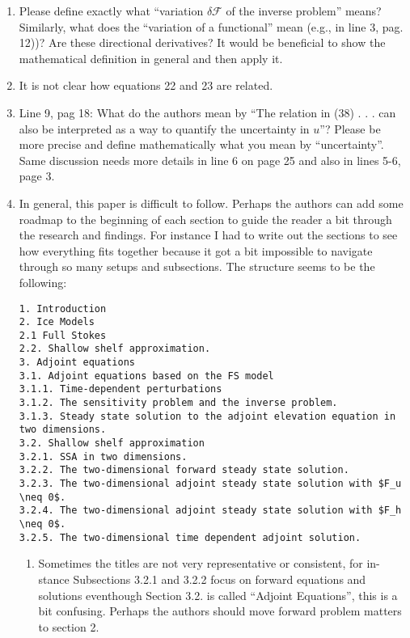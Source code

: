 \documentclass{article}
\begin{document}
\begin{enumerate}
    \item  Please define exactly what “variation $\delta\mathcal{F}$ of the inverse problem” means? Similarly, what does the “variation of a functional” mean (e.g., in line 3, pag. 12))? Are these directional derivatives? It would be beneficial to show the mathematical definition in general and then apply it.
    
    \item It is not clear how equations 22 and 23 are related.
    
    \item Line 9, pag 18: What do the authors mean by “The relation in (38) . . . can also be interpreted as a way to quantify the uncertainty in $u$”? Please be more precise and define mathematically what you mean by “uncertainty”. Same discussion needs more details in line 6 on page 25 and also in lines 5-6, page 3.
    
    \item In general, this paper is difficult to follow. Perhaps the authors can add some roadmap to the beginning of each section to guide the reader a bit through the research and findings. For instance I had to write out the sections to see how everything fits together because it got a bit impossible to navigate through so many setups and subsections. The structure seems to be the following:
    \begin{verbatim}
1. Introduction
2. Ice Models
2.1 Full Stokes
2.2. Shallow shelf approximation.
3. Adjoint equations
3.1. Adjoint equations based on the FS model
3.1.1. Time-dependent perturbations
3.1.2. The sensitivity problem and the inverse problem.
3.1.3. Steady state solution to the adjoint elevation equation in two dimensions.
3.2. Shallow shelf approximation
3.2.1. SSA in two dimensions.
3.2.2. The two-dimensional forward steady state solution.
3.2.3. The two-dimensional adjoint steady state solution with $F_u \neq 0$. 
3.2.4. The two-dimensional adjoint steady state solution with $F_h \neq 0$. 
3.2.5. The two-dimensional time dependent adjoint solution.
    \end{verbatim}

    \begin{enumerate}[label=(\alph*)]
        \item Sometimes the titles are not very representative or consistent, for in- stance Subsections 3.2.1 and 3.2.2 focus on forward equations and solutions eventhough Section 3.2. is called “Adjoint Equations”, this is a bit confusing. Perhaps the authors should move forward problem matters to section 2.
        

\end{enumerate}
\end{enumerate}
\end{document}
